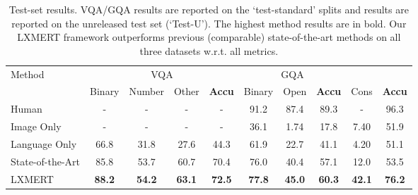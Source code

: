 \documentclass[11pt,a4paper]{article}
\newcommand\NLVR{}
\begin{document}
\begin{table*}[]
\centering
\begin{tabular}{lccccccccc}
\toprule
\multirow{2}{*}{Method}   & \multicolumn{4}{c}{VQA}                                                  & \multicolumn{3}{c}{GQA}                                                  & \multicolumn{2}{c}{\NLVR}    \\ 
\cmidrule(lr){2-5}
\cmidrule(lr){6-8} \cmidrule(lr){9-10}
 & Binary           & Number           & Other         & \multicolumn{1}{c}{\textbf{Accu}} & Binary           & Open                   & \multicolumn{1}{c}{\textbf{Accu}} & Cons & \textbf{Accu}          \\ \midrule
  Human     &  -  &  - & -  & -  & 91.2  &   87.4      & 89.3  & -    &96.3 \\
 Image Only       & - &   -   &-    & -      & 36.1    & 1.74      &   17.8  & 7.40    & 51.9  \\ 
 Language Only     &  66.8  &  31.8 & 27.6  & 44.3  & 61.9  &   22.7    & 41.1  &4.20    &51.1 \\
 \midrule
State-of-the-Art               & 85.8          & 53.7          & 60.7          & 70.4                      & 76.0          & 40.4          & 57.1                      &    12.0       & 53.5          \\ \midrule
LXMERT                      & \textbf{88.2} & \textbf{54.2} & \textbf{63.1} & \textbf{72.5}             & \textbf{77.8} & \textbf{45.0} & \textbf{60.3}             & \textbf{42.1} & \textbf{76.2} \\
\bottomrule
\end{tabular}
\caption{Test-set results. VQA/GQA results are reported on the `test-standard' splits and  results are reported on the unreleased test set (`Test-U'). The highest method results are in bold. Our LXMERT framework outperforms previous (comparable) state-of-the-art methods on all three datasets w.r.t. all metrics. }
\label{table:result}
\vspace{-10pt}
\end{table*}
\end{document}
